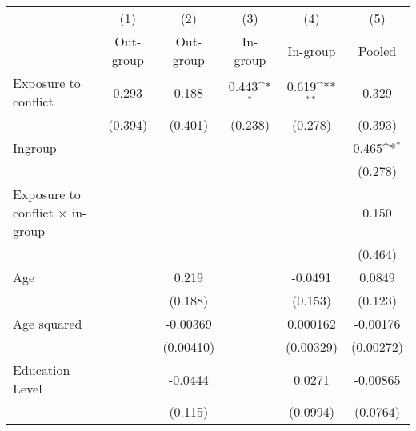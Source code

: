 {
\def\sym#1{\ifmmode^{#1}\else\(^{#1}\)\fi}
\begin{tabular}{l*{5}{c}}
\hline\hline
                    &\multicolumn{1}{c}{(1)}&\multicolumn{1}{c}{(2)}&\multicolumn{1}{c}{(3)}&\multicolumn{1}{c}{(4)}&\multicolumn{1}{c}{(5)}\\
                    &\multicolumn{1}{c}{Out-group}&\multicolumn{1}{c}{Out-group}&\multicolumn{1}{c}{In-group}&\multicolumn{1}{c}{In-group}&\multicolumn{1}{c}{Pooled}\\
\hline
Exposure to conflict&       0.293         &       0.188         &       0.443\sym{*}  &       0.619\sym{**} &       0.329         \\
                    &     (0.394)         &     (0.401)         &     (0.238)         &     (0.278)         &     (0.393)         \\
[1em]
Ingroup             &                     &                     &                     &                     &       0.465\sym{*}  \\
                    &                     &                     &                     &                     &     (0.278)         \\
[1em]
Exposure to conflict × in-group &                     &                     &                     &                     &       0.150         \\
                    &                     &                     &                     &                     &     (0.464)         \\
[1em]
Age                 &                     &       0.219         &                     &     -0.0491         &      0.0849         \\
                    &                     &     (0.188)         &                     &     (0.153)         &     (0.123)         \\
[1em]
Age squared         &                     &    -0.00369         &                     &    0.000162         &    -0.00176         \\
                    &                     &   (0.00410)         &                     &   (0.00329)         &   (0.00272)         \\
[1em]
Education Level     &                     &     -0.0444         &                     &      0.0271         &    -0.00865         \\
                    &                     &     (0.115)         &                     &    (0.0994)         &    (0.0764)         \\

\end{tabular}}

